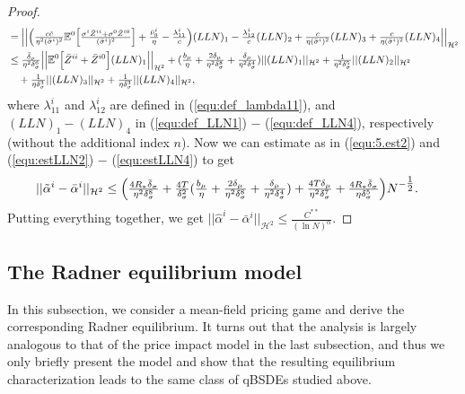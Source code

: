 \documentclass[10pt,a4paper]{article}
\theoremstyle{plain}
\theoremstyle{definition}
\numberwithin{equation}{section}
\begin{document}
\begin{proof}
\begin{align*}
&= \Big|\Big|\Bigl(\tfrac{c\tilde{c}}{\eta^{2}(\bar{\sigma}^{i})^{2}}\mathbb{E}^{0}\Bigl[\tfrac{\sigma^{i}\bar{Z}^{ii}+\sigma^{0}\bar{Z}^{i0}}{(\bar{\sigma}^{i})^{2}}\Bigr]+\tfrac{\bar{\nu}_{9}^{i}}{\eta}-\tfrac{\lambda_{11}^{i}}{c}\Bigr)(LLN)_{1} - \tfrac{\lambda_{12}^{i}}{c}(LLN)_{2} + \tfrac{c}{\eta(\bar{\sigma}^{i})^{2}}(LLN)_{3} + \tfrac{c}{\eta(\bar{\sigma}^{i})^{2}}(LLN)_{4}\Big|\Big|_{\mathcal{H}^{2}} \\
&\leq \tfrac{\bar{\delta}_{\sigma}}{\eta^{2}\delta_{\sigma}^{6}}\Big|\Big|\mathbb{E}^{0}\Bigl[\bar{Z}^{ii}+\bar{Z}^{i0}\Bigr](LLN)_{1}\Big|\Big|_{\mathcal{H}^{2}} + (\tfrac{b_{\mu}}{\eta}+\tfrac{2\delta_{\mu}}{\eta^{2}\delta_{\sigma}^{8}}+\tfrac{\delta_{\mu}}{\eta^{2}\delta_{\sigma}^{4}})||(LLN)_{1}||_{\mathcal{H}^{2}} + \tfrac{1}{\eta^{2}\delta_{\sigma}^{5}}||(LLN)_{2}||_{\mathcal{H}^{2}}\\
&\ \ \ + \tfrac{1}{\eta\delta_{\sigma}^{3}}||(LLN)_{3}||_{\mathcal{H}^{2}} + \tfrac{1}{\eta\delta_{\sigma}^{3}}||(LLN)_{4}||_{\mathcal{H}^{2}},
\end{align*}
where $\lambda_{11}^i$ and $\lambda_{12}^i$ are defined in (\ref{equ:def_lambda11}), and $(LLN)_{1}-(LLN)_{4}$ in (\ref{equ:def_LLN1}) $-$ (\ref{equ:def_LLN4}), respectively (without the additional index $n$). Now we can estimate as in (\ref{equ:5.est2}) and (\ref{equ:estLLN2}) $-$ (\ref{equ:estLLN4}) to get
\begin{align}
||\tilde{\alpha}^{i}-\bar{\alpha}^{i}||_{\mathcal{H}^{2}} &\leq \Bigl(\tfrac{4R_{*}\bar{\delta}_{\sigma}}{\eta^{2}\delta_{\sigma}^{8}} + \tfrac{4T}{\delta_{\sigma}^{2}}(\tfrac{b_{\mu}}{\eta}+\tfrac{2\delta_{\mu}}{\eta^{2}\delta_{\sigma}^{8}}+\tfrac{\delta_{\mu}}{\eta^{2}\delta_{\sigma}^{4}}) + \tfrac{4T\delta_{\mu}}{\eta^{2}\delta_{\sigma}^{7}} + \tfrac{4R_{*}\bar{\delta}_{\sigma}}{\eta\delta_{\sigma}^{5}}\Bigr)N^{-\tfrac{1}{2}}. \label{equ:convtilde}
\end{align}
Putting everything together, we get
$
||\hat{\alpha}^{i}-\bar{\alpha}^{i}||_{\mathcal{H}^{2}} \leq \tfrac{C^{**}}{(\ln{N})^{\alpha}}.
$

\end{proof}

\subsection{The Radner equilibrium model}
\label{sec:4.2}
In this subsection, we consider a mean-field pricing game and derive the corresponding Radner equilibrium. It turns out that the analysis is largely analogous to that of the price impact model in the last subsection, and thus we only briefly present the model and show that the resulting equilibrium characterization leads to the same class of qBSDEs studied above.
\end{document}
